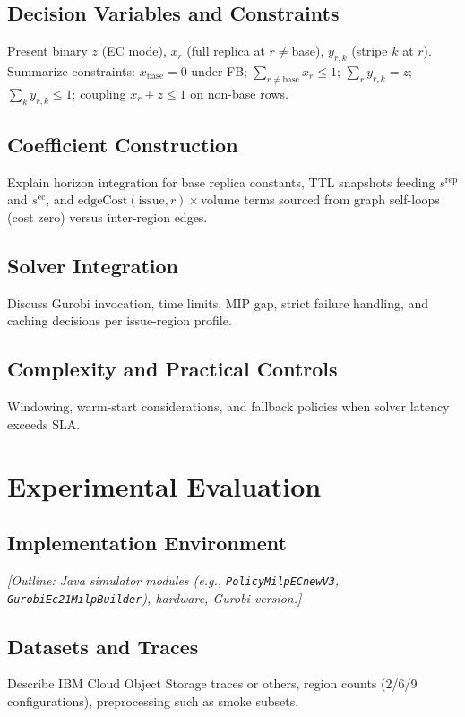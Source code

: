 \documentclass[conference]{IEEEtran}
\begin{document}
\subsection{Decision Variables and Constraints}
Present binary \(z\) (EC mode), \(x_r\) (full replica at \(r\neq\)base), \(y_{r,k}\) (stripe \(k\) at \(r\)).
Summarize constraints: \(x_{\mathrm{base}}=0\) under FB; \(\sum_{r\neq \mathrm{base}} x_r \le 1\); \(\sum_r y_{r,k}=z\); \(\sum_k y_{r,k}\le 1\); coupling \(x_r+z\le 1\) on non-base rows.

\subsection{Coefficient Construction}
Explain horizon integration for base replica constants, TTL snapshots feeding \(s^{\mathrm{rep}}\) and \(s^{\mathrm{ec}}\), and \(\mathrm{edgeCost}(\mathrm{issue}, r)\times\)volume terms sourced from graph self-loops (cost zero) versus inter-region edges.

\subsection{Solver Integration}
Discuss Gurobi invocation, time limits, MIP gap, strict failure handling, and caching decisions per issue-region profile.

\subsection{Complexity and Practical Controls}
Windowing, warm-start considerations, and fallback policies when solver latency exceeds SLA.

\section{Experimental Evaluation}
\label{sec:eval}

\subsection{Implementation Environment}
\textit{[Outline: Java simulator modules (e.g., \texttt{PolicyMilpECnewV3}, \texttt{GurobiEc21MilpBuilder}), hardware, Gurobi version.]}

\subsection{Datasets and Traces}
Describe IBM Cloud Object Storage traces or others, region counts (2/6/9 configurations), preprocessing such as smoke subsets.
\end{document}

